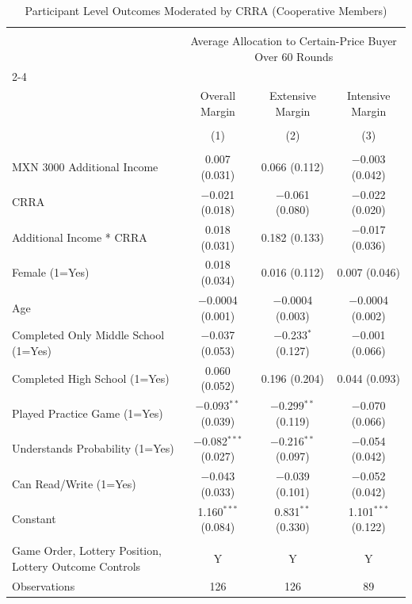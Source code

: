 
\begin{table}[!htbp] \centering 
  \caption{Participant Level Outcomes Moderated by CRRA (Cooperative Members)} 
  \label{participant_level_outcomes_crra_coop} 
\begin{tabular}{@{\extracolsep{5pt}}lccc} 
\\[-1.8ex]\hline 
\hline \\[-1.8ex] 
 & \multicolumn{3}{c}{Average Allocation to Certain-Price Buyer Over 60 Rounds} \\ 
\cline{2-4} 
\\[-1.8ex] & Overall Margin & Extensive Margin & Intensive Margin \\ 
\\[-1.8ex] & (1) & (2) & (3)\\ 
\hline \\[-1.8ex] 
 MXN 3000 Additional Income & 0.007 (0.031) & 0.066 (0.112) & $-$0.003 (0.042) \\ 
  CRRA & $-$0.021 (0.018) & $-$0.061 (0.080) & $-$0.022 (0.020) \\ 
  Additional Income * CRRA & 0.018 (0.031) & 0.182 (0.133) & $-$0.017 (0.036) \\ 
  Female (1=Yes) & 0.018 (0.034) & 0.016 (0.112) & 0.007 (0.046) \\ 
  Age & $-$0.0004 (0.001) & $-$0.0004 (0.003) & $-$0.0004 (0.002) \\ 
  Completed Only Middle School (1=Yes) & $-$0.037 (0.053) & $-$0.233$^{*}$ (0.127) & $-$0.001 (0.066) \\ 
  Completed High School (1=Yes) & 0.060 (0.052) & 0.196 (0.204) & 0.044 (0.093) \\ 
  Played Practice Game (1=Yes) & $-$0.093$^{**}$ (0.039) & $-$0.299$^{**}$ (0.119) & $-$0.070 (0.066) \\ 
  Understands Probability (1=Yes) & $-$0.082$^{***}$ (0.027) & $-$0.216$^{**}$ (0.097) & $-$0.054 (0.042) \\ 
  Can Read/Write (1=Yes) & $-$0.043 (0.033) & $-$0.039 (0.101) & $-$0.052 (0.042) \\ 
  Constant & 1.160$^{***}$ (0.084) & 0.831$^{**}$ (0.330) & 1.101$^{***}$ (0.122) \\ 
 \hline \\[-1.8ex] 
Game Order, Lottery Position, Lottery Outcome Controls & Y & Y & Y \\ 
Observations & 126 & 126 & 89 \\ 

\end{tabular}
\end{table}
